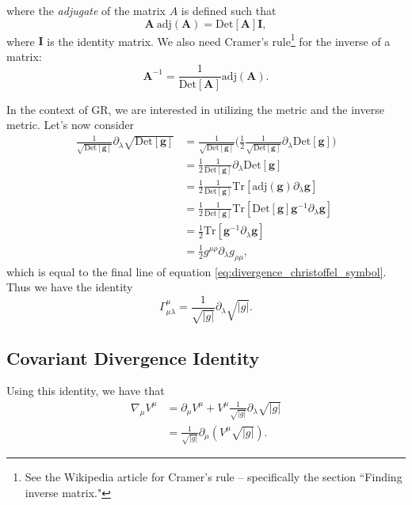 \documentclass[12pt]{article}
\numberwithin{equation}{section}
\begin{document}
where the \textit{adjugate} of the matrix $A$ is defined such that
\begin{equation}
\textbf{A} ~\mathrm{adj}(\textbf{A}) = \mathrm{Det}[\textbf{A}] \textbf{I},
\end{equation}
where $\textbf{I}$ is the identity matrix.  We also need Cramer's rule\footnote{See the Wikipedia article for Cramer's rule -- specifically the section ``Finding inverse matrix."} for the inverse of a matrix:
\begin{equation}
\textbf{A}^{-1} = \frac{1}{\mathrm{Det}[\textbf{A}]} \mathrm{adj}(\textbf{A}).
\end{equation}

In the context of GR, we are interested in utilizing the metric and the inverse metric.  Let's now consider
\begin{equation*}
\begin{aligned}
\frac{1}{\sqrt{\mathrm{Det}[\textbf{g}]}} \partial_\lambda \sqrt{\mathrm{Det}[\textbf{g}]} &= \frac{1}{\sqrt{\mathrm{Det}[\textbf{g}]}} \Big(\frac{1}{2} \frac{1}{\sqrt{\mathrm{Det}[\textbf{g}]}} \partial_\lambda \mathrm{Det}[\textbf{g}] \Big) \\
&= \frac{1}{2} \frac{1}{\mathrm{Det}[\textbf{g}]} \partial_\lambda \mathrm{Det}[\textbf{g}] \\
&= \frac{1}{2} \frac{1}{\mathrm{Det}[\textbf{g}]} \mathrm{Tr}[\mathrm{adj}(\textbf{g}) \partial_\lambda \textbf{g}] \\
&= \frac{1}{2} \frac{1}{\mathrm{Det}[\textbf{g}]} \mathrm{Tr}[ \mathrm{Det}[\textbf{g}] \textbf{g}^{-1} \partial_\lambda \textbf{g}] \\
&= \frac{1}{2} \mathrm{Tr}[ \textbf{g}^{-1} \partial_\lambda \textbf{g}] \\
&= \frac{1}{2} g^{\mu \rho} \partial_{\lambda} g_{\rho \mu},
\end{aligned}
\end{equation*}
which is equal to the final line of equation \ref{eq:divergence_christoffel_symbol}.  Thus we have the identity
\begin{equation}
\Gamma^\mu_{\mu \lambda} = \frac{1}{\sqrt{|g|}} \partial_\lambda \sqrt{|g|}.
\end{equation}

\subsection{Covariant Divergence Identity}

Using this identity, we have that
\begin{equation} \label{eq:divergence_identity}
\begin{aligned}
\nabla_\mu V^\mu &= \partial_\mu V^\mu + V^\mu \frac{1}{\sqrt{|g|}} \partial_\lambda \sqrt{|g|} \\
&= \frac{1}{\sqrt{|g|}} \partial_\mu (V^\mu \sqrt{|g|}).
\end{aligned}
\end{equation}
\end{document}
